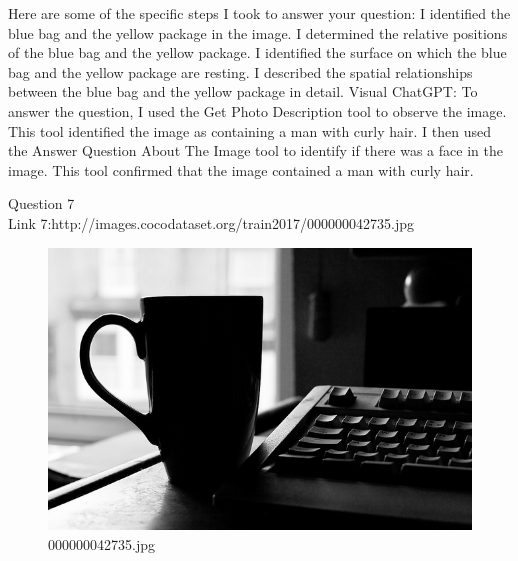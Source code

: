 \begin{enumerate}
{        Here are some of the specific steps I took to answer your question:
        I identified the blue bag and the yellow package in the image.
        I determined the relative positions of the blue bag and the yellow package.
        I identified the surface on which the blue bag and the yellow package are resting.
        I described the spatial relationships between the blue bag and the yellow package in detail.}
        \subitem Visual ChatGPT: To answer the question, I used the Get Photo Description tool to observe the image. This tool identified the image as containing a man with curly hair. I then used the Answer Question About The Image tool to identify if there was a face in the image. This tool confirmed that the image contained a man with curly hair.
    \end{enumerate}
Question 7\\
Link 7:http://images.cocodataset.org/train2017/000000042735.jpg
    \begin{figure}[h]
        \centering
        \includegraphics[width=0.8\linewidth]{../image set/easy/000000042735.jpg}
        \caption{000000042735.jpg}
    \end{figure}

